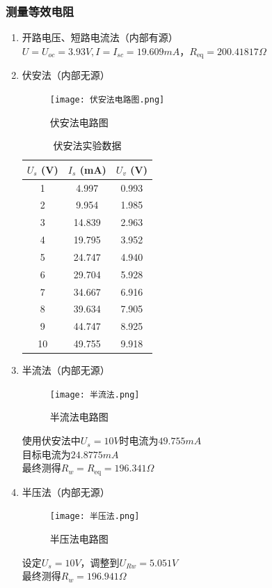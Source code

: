 \documentclass[dvipsnames, svgnames,a4paper,11pt]{article}
\begin{document}
	\subsubsection{测量等效电阻} 
	\begin{enumerate}

     \item 开路电压、短路电流法（内部有源）\\
	 $U=U_{oc}=3.93V,I=I_{sc}=19.609mA$，$R_{\mathrm{eq}}=200. 41817 \Omega $
	 \item 伏安法（内部无源）
	     \begin{figure}[{H}]
			\centering
			\texttt{[image: 伏安法电路图.png]}
			\caption{伏安法电路图}
			\label{}
		 \end{figure}
		 \begin{table}[h]
			\centering
			\begin{tabular}{|c|c|c|}
			\hline
			$U_s$ (V) & $I_s$ (mA) & $U_v$ (V) \\
			\hline
			1 & 4.997 & 0.993 \\
			2 & 9.954 & 1.985 \\
			3 & 14.839 & 2.963 \\
			4 & 19.795 & 3.952 \\
			5 & 24.747 & 4.940 \\
			6 & 29.704 & 5.928 \\
			7 & 34.667 & 6.916 \\
			8 & 39.634 & 7.905 \\
			9 & 44.747 & 8.925 \\
			10 & 49.755 & 9.918 \\
			\hline
			\end{tabular}
			\caption{伏安法实验数据}
			\label{tab:data}
			\end{table}
			\item 半流法（内部无源）
			\begin{figure}[{H}]
				\centering
				\texttt{[image: 半流法.png]}
				\caption{半流法电路图}
				\label{}
			\end{figure}
			使用伏安法中$U_s=10V$时电流为$49.755mA$\\目标电流为$24.8775mA$\\
			最终测得$R_w=R_{\mathrm{eq}}=196.341 \Omega $
			\item 半压法（内部无源）
			\begin{figure}[{H}]
				\centering
				\texttt{[image: 半压法.png]}
				\caption{半压法电路图}
				\label{}
			\end{figure}
			设定$U_s=10V$，调整到$U_{Rw}=5.051V$\\
			最终测得$R_w=196.941\Omega$
			

		 
	\end{enumerate}
\end{document}
